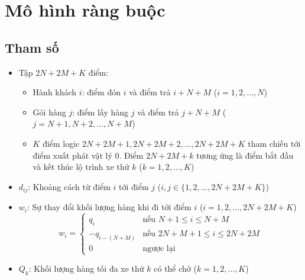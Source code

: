 \documentclass[3p,12pt]{article}
\begin{document}
	\section{Mô hình ràng buộc}
	\subsection{Tham số}
	\begin{itemize}
		\item Tập $2N+2M+K$ điểm:
		\begin{itemize}
			\item Hành khách $i$: điểm đón $i$ và điểm trả $i+N+M$ ($i=1,2,...,N$)
			\item Gói hàng $j$: điểm lấy hàng $j$ và điểm trả $j+N+M$ ($j=N+1,N+2,...,N+M$)
			\item $K$ điểm logic $2N+2M+1, 2N+2M+2, ..., 2N+2M+K$ tham chiếu tới điểm xuất phát vật lý $0$. Điểm $2N+2M+k$ tương ứng là điểm bắt đầu và kết thúc lộ trình xe thứ $k$ ($k=1,2,...,K$)
		\end{itemize}
		\item $d_{ij}$: Khoảng cách từ điểm $i$ tới điểm $j$ ($i,j\in \{1,2,...,2N+2M+K\}$)
		\item $w_i$: Sự thay đổi khối lượng hàng khi đi tới điểm $i$ ($i=1,2,...,2N+2M+K$)
		\begin{equation}
			w_i =
			\begin{cases}
			q_i & \text{nếu } N+1\leq i\leq N+M\\
			-q_{i-(N+M)} & \text{nếu } 2N+M+1\leq i\leq 2N+2M\\
			0 & \text{ngược lại}
			\end{cases} 
		\end{equation}
		\item $Q_k$: Khối lượng hàng tối đa xe thứ $k$ có thể chở ($k=1,2,...,K$)
	\end{itemize}
\end{document}
